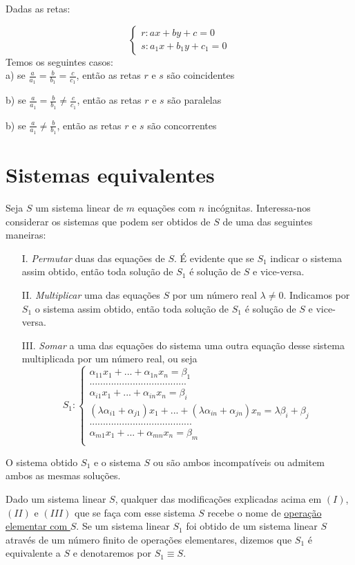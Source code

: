 Dadas as retas:

\begin{equation*}
\begin{cases}
r: ax+by+c=0 \\
s: a_{1}x+b_{1}y+c_{1}=0
\end{cases}
\end{equation*}
Temos os seguintes casos:\\
a) se $\frac{a}{a_{1}}=\frac{b}{b_{1}}=\frac{c}{c_{1}}$, então as retas $r$ e $s$ são coincidentes

b) se $\frac{a}{a_{1}}=\frac{b}{b_{1}}\neq\frac{c}{c_{1}}$, então as retas $r$ e $s$ são paralelas

b) se $\frac{a}{a_{1}}\neq\frac{b}{b_{1}}$, então as retas $r$ e $s$ são concorrentes
\newpage
\section{Sistemas equivalentes}
Seja $S$ um sistema linear de $m$ equações com $n$ incógnitas. Interessa-nos considerar os sistemas que podem ser obtidos de $S$ de uma das seguintes maneiras:

\begin{itemize}
	\item[I.] \textit{Permutar} duas das equações de $S$. É evidente que se $S_{1}$ indicar o sistema assim obtido, então toda solução de $S_{1}$ é solução de $S$ e vice-versa.
	\item[II.] \textit{Multiplicar} uma das equações $S$ por um número real $\lambda \neq 0$. Indicamos por $S_{1}$ o sistema assim obtido, então toda solução de $S_{1}$ é solução de $S$ e vice-versa.
	\item [III.] \textit{Somar} a uma das equações do sistema uma outra equação desse sistema multiplicada por um número real, ou seja
	 \begin{equation*}
	 S_{1}:\begin{cases}
	 \alpha_{11}x_{1}+...+\alpha_{1n}x_{n}=\beta_{1}\\
	 ....................................\\
	 \alpha_{i1}x_{1}+...+\alpha_{in}x_{n}=\beta_{i}\\
	 (\lambda\alpha_{i1}+\alpha_{j1})x_{1}+...+(\lambda\alpha_{in}+\alpha_{jn})x_{n}=\lambda\beta_{i}+\beta_{j} \\
	 ......................................\\
	 \alpha_{m1}x_{1}+...+\alpha_{mn}x_{n}=\beta_{m}\\
	 \end{cases}
	 \end{equation*}   
\end{itemize}
O sistema obtido $S_{1}$ e o sistema $S$ ou são ambos incompatíveis ou admitem ambos as mesmas soluções.
\begin{df}
	Dado um sistema linear $S$, qualquer das modificações explicadas acima em $(I)$, $(II)$ e $(III)$ que se faça com esse sistema $S$ recebe o nome de \underline{operação elementar com $S$}. Se um sistema linear $S_{1}$ foi obtido de um sistema linear $S$ através de um número finito de operações elementares, dizemos que $S_{1}$ é equivalente a $S$ e denotaremos por $S_{1}\equiv S$.	
\end{df}
